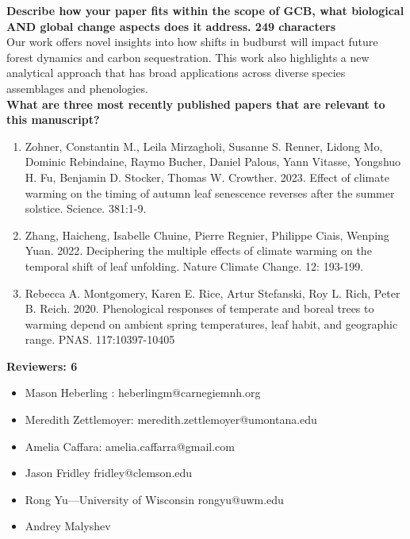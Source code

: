 \documentclass{letter}
\begin{document}
\textbf{Describe how your paper fits within the scope of GCB, what biological AND global change aspects does it address. 249 characters}\\

Our work offers novel insights into how shifts in budburst will impact future forest dynamics and carbon sequestration. This work also highlights a new analytical approach that has broad applications across diverse species assemblages and phenologies.\\

\textbf{What are three most recently published papers that are relevant to this manuscript?}\\ 
\begin{enumerate}
\item Zohner, Constantin M., Leila Mirzagholi, Susanne S. Renner, Lidong Mo, Dominic Rebindaine, Raymo Bucher, Daniel Palous, Yann Vitasse, Yongshuo H. Fu, Benjamin D. Stocker, Thomas W. Crowther. 2023. Effect of climate warming on the timing of autumn leaf senescence reverses after the summer solstice. Science. 381:1-9.\\
\item Zhang, Haicheng, Isabelle Chuine, Pierre Regnier, Philippe Ciais, Wenping Yuan. 2022. Deciphering the multiple effects of climate warming on the temporal shift of leaf unfolding. Nature Climate Change. 12: 193-199.\\
\item Rebecca A. Montgomery, Karen E. Rice, Artur Stefanski, Roy L. Rich, Peter B. Reich. 2020. Phenological responses of temperate and boreal trees to warming depend on ambient spring temperatures, leaf habit, and geographic range. PNAS. 117:10397-10405
\end{enumerate}

\textbf{Reviewers: 6}
\begin{itemize}
\item Mason Heberling : heberlingm@carnegiemnh.org
\item Meredith Zettlemoyer: meredith.zettlemoyer@umontana.edu
\item Amelia Caffara: amelia.caffarra@gmail.com
\item Jason Fridley fridley@clemson.edu
\item Rong Yu---University of Wisconsin rongyu@uwm.edu
\item Andrey Malyshev
\end{itemize}




\end{document}
